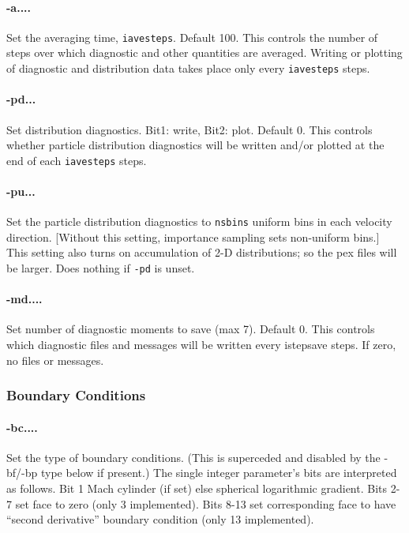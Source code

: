 \documentclass[12pt]{article}
\begin{document}
\paragraph{-a....}  Set the averaging time, \verb!iavesteps!. Default 100.
This controls the number of steps over which diagnostic and other
quantities are averaged. Writing or plotting of diagnostic and
distribution data takes place only every \verb!iavesteps! steps.

\paragraph{-pd...}
Set distribution diagnostics. Bit1: write, Bit2: plot. Default 0.
This controls whether particle distribution diagnostics will be
written and/or plotted at the end of each \verb!iavesteps! steps. 

\paragraph{-pu...}
Set the particle distribution diagnostics to \verb!nsbins! uniform
bins in each velocity direction. [Without this setting, importance
sampling sets non-uniform bins.] This setting also turns on
accumulation of 2-D distributions; so the pex files will be larger.
Does nothing if \verb!-pd! is unset.

\paragraph{-md....}  Set number of diagnostic moments to save (max 7). Default 0.
This controls which diagnostic files and messages will be written
every istepsave steps. If zero, no files or messages.

\subsubsection*{Boundary Conditions}

\paragraph{-bc....} Set the type of boundary conditions. (This is
superceded and disabled by the -bf/-bp type below if present.) The single
integer parameter's bits are interpreted as follows.  Bit 1 Mach
cylinder (if set) else spherical logarithmic gradient.  Bits 2-7 set
face to zero (only 3 implemented). Bits 8-13 set corresponding face to
have ``second derivative'' boundary condition (only 13 implemented).
\end{document}
